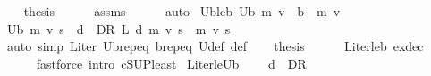 \begin{isabellebody}
\ \ \isamarkupfalse%
\ {\isacharquery}{\kern0pt}thesis\isanewline
\ \ \ \ \isamarkupfalse%
\ assms\isanewline
\ \ \ \ \isamarkupfalse%
\ auto\isanewline
{}\isamarkupfalse%
%
\endisatagproof
{\isafoldproof}%
%
\isadelimproof
\isanewline
%
\endisadelimproof
\isanewline
{}\isamarkupfalse%
\ U\isactrlsub b{\isacharunderscore}{\kern0pt}le{\isacharunderscore}{\kern0pt}{\isasymL}\isactrlsub b{\isacharcolon}{\kern0pt}\ {\isachardoublequoteopen}U\isactrlsub b\ m\ v\ {\isasymle}\ {\isacharparenleft}{\kern0pt}{\isasymL}\isactrlsub b\ {\isacharcircum}{\kern0pt}{\isacharcircum}{\kern0pt}\ m{\isacharparenright}{\kern0pt}\ v{\isachardoublequoteclose}\isanewline
%
\isadelimproof
%
\endisadelimproof
%
\isatagproof
{}\isamarkupfalse%
\ {\isacharminus}{\kern0pt}\isanewline
\ \ \isamarkupfalse%
\ {\isachardoublequoteopen}U\isactrlsub b\ m\ v\ s\ {\isacharequal}{\kern0pt}\ {\isacharparenleft}{\kern0pt}{\isasymSqunion}d\ {\isasymin}\ D\isactrlsub R{\isachardot}{\kern0pt}\ {\isacharparenleft}{\kern0pt}L\ d{\isacharcircum}{\kern0pt}{\isacharcircum}{\kern0pt}\ m{\isacharparenright}{\kern0pt}\ v\ s{\isacharparenright}{\kern0pt}{\isachardoublequoteclose}\ \ m\ v\ s\isanewline
\ \ \ \ \isamarkupfalse%
\ {\isacharparenleft}{\kern0pt}auto\ simp{\isacharcolon}{\kern0pt}\ L{\isacharunderscore}{\kern0pt}iter\ U\isactrlsub b{\isachardot}{\kern0pt}rep{\isacharunderscore}{\kern0pt}eq\ {\isasymL}\isactrlsub b{\isachardot}{\kern0pt}rep{\isacharunderscore}{\kern0pt}eq\ U{\isacharunderscore}{\kern0pt}def\ {\isasymL}{\isacharunderscore}{\kern0pt}def{\isacharparenright}{\kern0pt}\isanewline
\ \ \isamarkupfalse%
\ {\isacharquery}{\kern0pt}thesis\isanewline
\ \ \ \ \isamarkupfalse%
\ L{\isacharunderscore}{\kern0pt}iter{\isacharunderscore}{\kern0pt}le{\isacharunderscore}{\kern0pt}{\isasymL}\isactrlsub b\ ex{\isacharunderscore}{\kern0pt}dec\isanewline
\ \ \ \ \isamarkupfalse%
\ {\isacharparenleft}{\kern0pt}fastforce\ intro{\isacharbang}{\kern0pt}{\isacharcolon}{\kern0pt}\ cSUP{\isacharunderscore}{\kern0pt}least{\isacharparenright}{\kern0pt}\isanewline
{}\isamarkupfalse%
%
\endisatagproof
{\isafoldproof}%
%
\isadelimproof
\isanewline
%
\endisadelimproof
\isanewline
\isanewline
{}\isamarkupfalse%
\ L{\isacharunderscore}{\kern0pt}iter{\isacharunderscore}{\kern0pt}le{\isacharunderscore}{\kern0pt}U\isactrlsub b{\isacharcolon}{\kern0pt}\ \isanewline
\ \ \ {\isachardoublequoteopen}d\ {\isasymin}\ D\isactrlsub R{\isachardoublequoteclose}\ \isanewline

\end{isabellebody}
